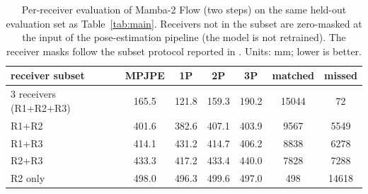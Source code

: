 \begin{table}[!ht]
\caption{Per-receiver evaluation of Mamba-2 Flow (two steps) on the same held-out evaluation set as
Table~\ref{tab:main}. Receivers not in the subset are zero-masked
at the input of the pose-estimation pipeline (the model is not retrained).
The receiver masks follow the subset protocol reported in \cite{yan2024personwifi3d}. Units: mm; lower
is better.}
\label{tab:receiver-ablation}
\centering
\begin{tabular}{l c c c c c c}
\toprule
receiver subset & MPJPE & 1P & 2P & 3P & matched & missed \\
\midrule
    3 receivers (R1{+}R2{+}R3) & 165.5 & 121.8 & 159.3 & 190.2 & 15044 & 72 \\
    R1{+}R2 & 401.6 & 382.6 & 407.1 & 403.9 & 9567 & 5549 \\
    R1{+}R3 & 414.1 & 431.2 & 414.7 & 406.2 & 8838 & 6278 \\
    R2{+}R3 & 433.3 & 417.2 & 433.4 & 440.0 & 7828 & 7288 \\
    R2 only & 498.0 & 496.3 & 499.6 & 497.0 & 498 & 14618 \\
\bottomrule
\end{tabular}
\end{table}

